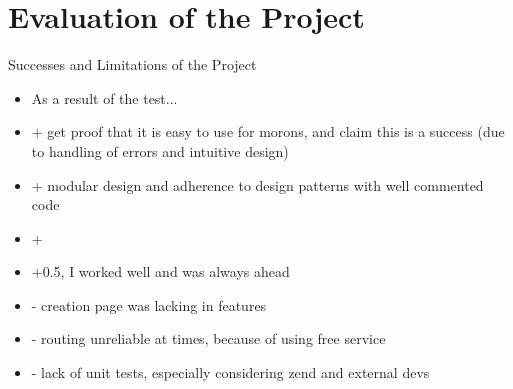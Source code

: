 \section{Evaluation of the Project}

{\color{red}
	Successes and Limitations of the Project
	\begin{itemize}
		\item As a result of the test...
		\item + get proof that it is easy to use for morons, and claim this is a success (due to handling of errors and intuitive design)
		\item + modular design and adherence to design patterns with well commented code
		\item + 
		\item +0.5, I worked well and was always ahead
		\item - creation page was lacking in features
		\item - routing unreliable at times, because of using free service
		\item - lack of unit tests, especially considering zend and external devs
	\end{itemize}
}
